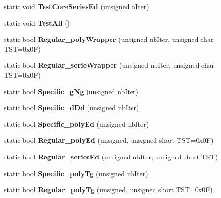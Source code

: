 \begin{DoxyCompactItemize}
\mbox{\label{classtest_1_1_test_a478b16331ff880bf8bff42ada9c79fb8}} 
static void {\bfseries Test\+Core\+Series\+Ed} (unsigned n\+Iter)
\item 
\mbox{\label{classtest_1_1_test_a8b9dd01b07efe65694828b65cb863702}} 
static void {\bfseries Test\+All} ()
\item 
\mbox{\label{classtest_1_1_test_a5f0c4a7d23d9b300635d8b2b047bcb5c}} 
static bool {\bfseries Regular\+\_\+poly\+Wrapper} (unsigned nb\+Iter, unsigned char T\+ST=0x0\+F)
\item 
\mbox{\label{classtest_1_1_test_a5811fdd54af42c504d5931166da983af}} 
static bool {\bfseries Regular\+\_\+serie\+Wrapper} (unsigned nb\+Iter, unsigned char T\+ST=0x0\+F)
\item 
\mbox{\label{classtest_1_1_test_a093d0df39f9580c662348583d1586abe}} 
static bool {\bfseries Specific\+\_\+g\+Ng} (unsigned nb\+Iter)
\item 
\mbox{\label{classtest_1_1_test_ad740bf243567502508c2bbbd4d7f212f}} 
static bool {\bfseries Specific\+\_\+d\+Dd} (unsigned nb\+Iter)
\item 
\mbox{\label{classtest_1_1_test_a42cdd908c6aabdd0fedcf8f3c9c452f3}} 
static bool {\bfseries Specific\+\_\+poly\+Ed} (unsigned nb\+Iter)
\item 
\mbox{\label{classtest_1_1_test_a166b428346bda678c4b39b20192ddc31}} 
static bool {\bfseries Regular\+\_\+poly\+Ed} (unsigned, unsigned short T\+ST=0x0\+F)
\item 
\mbox{\label{classtest_1_1_test_aac04d90279c3349fedca2cfe670c1970}} 
static bool {\bfseries Regular\+\_\+series\+Ed} (unsigned nb\+Iter, unsigned short T\+ST)
\item 
\mbox{\label{classtest_1_1_test_a07ea710535261fc55b0dbacc8d34ea99}} 
static bool {\bfseries Specific\+\_\+poly\+Tg} (unsigned nb\+Iter)
\item 
\mbox{\label{classtest_1_1_test_a7aaed77b8a4d6a959f42fc036ef75abe}} 
static bool {\bfseries Regular\+\_\+poly\+Tg} (unsigned, unsigned short T\+ST=0x0\+F)
\end{DoxyCompactItemize}


